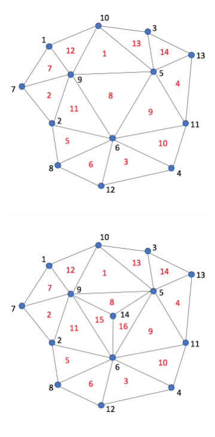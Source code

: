 \documentclass{article}
\begin{document}
\begin{figure}[H] \label{fig:split_triangle}
  \centering
  \begin{subfigure}[b]{0.4\linewidth}
    \includegraphics[width=\linewidth]{Fig_split_triangle_01.png}
    \caption{}
  \end{subfigure}
  \begin{subfigure}[b]{0.4\linewidth}
    \includegraphics[width=\linewidth]{Fig_split_triangle_02.png}

\end{subfigure}
\end{figure}
\end{document}
